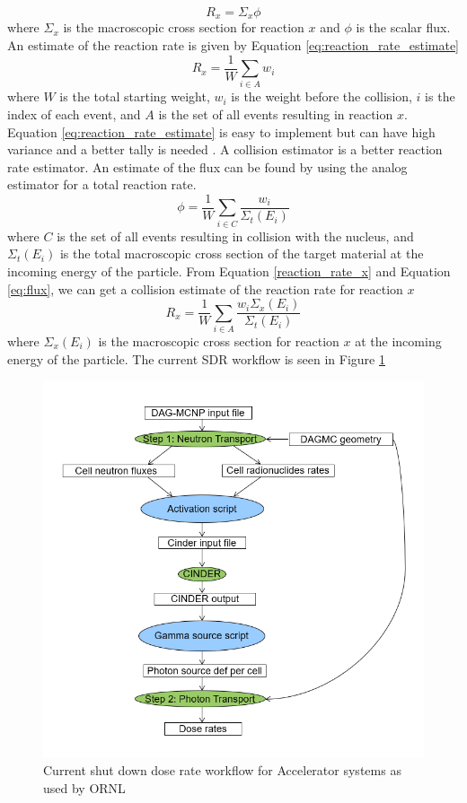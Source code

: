 \begin{equation}\label{reaction_rate_x}
  R_{x} = \Sigma_{x} \phi
\end{equation}
where $\Sigma_{x}$ is the  macroscopic cross section for reaction $x$ and
$\phi$ is the scalar flux.
An estimate of the reaction rate is given by Equation \ref{eq:reaction_rate_estimate}
\begin{equation}\label{eq:reaction_rate_estimate}
  R_{x} = \frac{1}{W} \sum_{i \in A} w_{i}
\end{equation}
where $W$ is the total starting weight, $w_{i}$ is the weight before the
collision, $i$ is the index of each event, and $A$ is the set of all events
resulting in reaction $x$.
Equation \ref{eq:reaction_rate_estimate} is easy to implement but can have
high variance and a better tally is needed \cite{OpenMC}.
A collision estimator is a better reaction rate estimator.
An estimate of the flux can be found by using the analog estimator
for a total reaction rate.
\begin{equation}\label{eq:flux}
	\phi = \frac{1}{W} \sum_{i \in C} \frac{w_{i}}{\Sigma_{t}(E_{i})}
\end{equation}
where $C$ is the set of all events resulting in collision with the nucleus,
and  $\Sigma_{t}(E_{i})$ is the total macroscopic cross section of the
target material at the incoming energy of the particle.
From Equation \ref{reaction_rate_x} and Equation \ref{eq:flux}, we can get
a collision estimate of the reaction rate for reaction $x$
\begin{equation}\label{reaction_x_estimate}
  R_{x} = \frac{1}{W} \sum_{i \in A} \frac{w_{i} \Sigma_{x}(E_{i})}{\Sigma_{t}(E_{i})}
\end{equation}
where $\Sigma_{x}(E_{i})$ is the macroscopic cross section for reaction $x$
at the incoming energy of the particle.
The current SDR workflow is seen in Figure \ref{rnucs_r2s}
\begin{figure}[h!]
\begin{centering}
\includegraphics[scale=0.4]{../figs/rnucs_r2s.png}
\caption{Current shut down dose rate workflow for Accelerator systems as used by ORNL}
\label{rnucs_r2s}
\end{centering}
\end{figure}
\newpage
